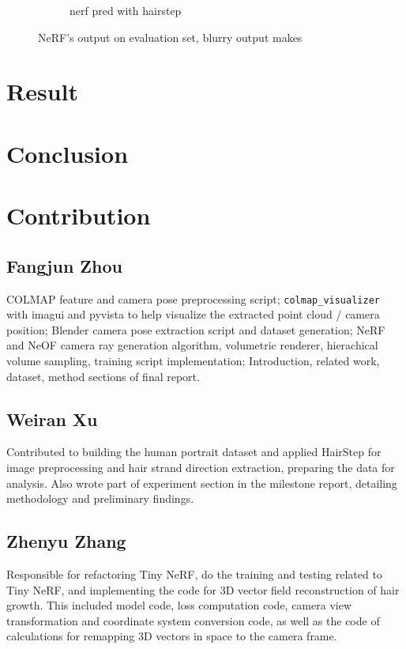 \documentclass[12pt]{article}
\begin{document}
\begin{figure}[h]
\begin{subfigure}{0.48\textwidth}
\begin{subfigure}{0.48\textwidth}
        \end{subfigure}
        \caption{nerf pred with hairstep}
    \end{subfigure}

    \caption{NeRF's output on evaluation set, blurry output makes }
    \label{fig:nerf_hairstep}
\end{figure}

\section{Result}


\section{Conclusion}


\newpage

\printbibliography

\newpage

\section{Contribution}

\subsection{Fangjun Zhou}

COLMAP feature and camera pose preprocessing script; \texttt{colmap\_visualizer} with imagui and pyvista to help visualize the extracted point cloud / camera position; Blender camera pose extraction script and dataset generation; NeRF and NeOF camera ray generation algorithm, volumetric renderer, hierachical volume sampling, training script implementation; Introduction, related work, dataset, method sections of final report.

\subsection{Weiran Xu}

Contributed to building the human portrait dataset and applied HairStep for image preprocessing and hair strand direction extraction, preparing the data for analysis. Also wrote part of experiment section in the milestone report, detailing methodology and preliminary findings.

\subsection{Zhenyu Zhang}

Responsible for refactoring Tiny NeRF, do the training and testing related to Tiny NeRF, and implementing the code for 3D vector field reconstruction of hair growth. This included model code, loss computation code, camera view transformation and coordinate system conversion code, as well as the code of calculations for remapping 3D vectors in space to the camera frame.
\end{document}

